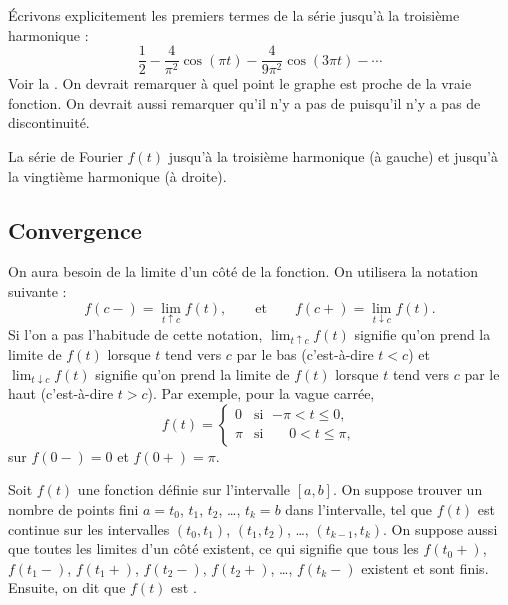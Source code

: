\begin{example}
Écrivons explicitement les premiers termes de la série jusqu'à la troisième harmonique :
\begin{equation*}
\frac{1}{2} -
\frac{4}{\pi^2} \cos (\pi t)
-
\frac{4}{9 \pi^2} \cos (3 \pi t)
- \cdots
\end{equation*}
Voir la .  On devrait remarquer à quel point le graphe est proche de la vraie fonction. On devrait aussi remarquer qu'il n'y a pas de 
 puisqu'il n'y a pas de discontinuité.

\begin{myfig}
\capstart
\caption{La série de Fourier $f(t)$ jusqu'à la troisième harmonique (à gauche)
et jusqu'à la vingtième harmonique (à droite).\label{gfs:sawcontfsfig}}
\end{myfig}
\end{example}

\subsection{Convergence}

On aura besoin de la limite d'un côté de la fonction. On utilisera la notation suivante :
\begin{equation*}
f(c-) = \lim_{t \uparrow c} f(t),
\qquad \text{et} \qquad
f(c+) = \lim_{t \downarrow c} f(t).
\end{equation*}
Si l'on a pas l'habitude de cette notation, 
$\lim_{t \uparrow c} f(t)$ signifie qu'on prend la limite de $f(t)$
lorsque $t$ tend vers $c$ par le bas (c'est-à-dire $t < c$) et
$\lim_{t \downarrow c} f(t)$ signifie qu'on prend la limite de $f(t)$
lorsque $t$ tend vers $c$ par le haut (c'est-à-dire $t > c$).
Par exemple, pour la vague carrée, 
\begin{equation} \label{gfs:sqwaveeq}
f(t) =
\begin{cases}
0 & \text{si } \; {-\pi} < t \leq 0 , \\
\pi & \text{si } \; \phantom{-}0 < t \leq \pi ,
\end{cases}
\end{equation}
sur $f(0-) = 0$ et $f(0+) = \pi$.

Soit $f(t)$ une fonction définie sur l'intervalle $[a,b]$. On suppose trouver un nombre de points fini
$a=t_0$, $t_1$, $t_2$, \ldots, $t_k=b$ dans l'intervalle, tel que  $f(t)$ est continue sur les intervalles
  $(t_0,t_1)$, 
$(t_1,t_2)$, \ldots, 
$(t_{k-1},t_k)$.
On suppose aussi que toutes les limites d'un côté existent, ce qui signifie que tous les 
$f(t_0+)$,
$f(t_1-)$,
$f(t_1+)$,
$f(t_2-)$,
$f(t_2+)$,
\ldots,
$f(t_k-)$
existent et sont finis.
Ensuite, on dit que $f(t)$ est \emph{}.

